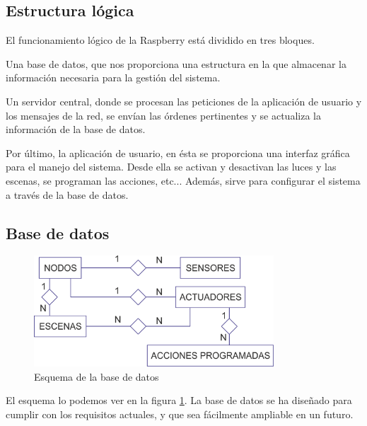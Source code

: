 \subsection{Estructura lógica}

El funcionamiento lógico de la Raspberry está dividido en tres bloques. 

Una base de datos, que nos proporciona una estructura en la que almacenar la información necesaria para la gestión del sistema. 


Un servidor central, donde se procesan las peticiones de la aplicación de usuario y los mensajes de la red, se envían las órdenes pertinentes y se actualiza la información de la base de datos.

Por último, la aplicación de usuario, en ésta se proporciona una interfaz gráfica para el manejo del sistema. Desde ella se activan y desactivan las luces y las escenas, se programan las acciones, etc... Además, sirve para configurar el sistema a través de la base de datos.

\subsection{Base de datos}
\begin{figure}[htbp]
    \centering
    \includegraphics[width=0.80\textwidth]{imagenes/esquema_bd.png}
    \caption{Esquema de la base de datos}
    \label{fig:esquema_bd}
\end{figure}

El esquema lo podemos ver en la figura \ref{fig:esquema_bd}. La base de datos se ha diseñado para cumplir con los requisitos actuales, y que sea fácilmente ampliable en un futuro.



